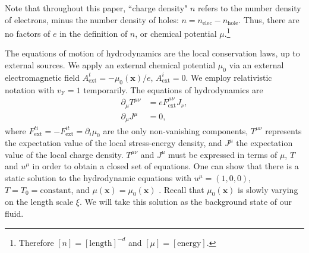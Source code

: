 \documentclass[10pt, oneside]{book}
\begin{document}
\begin{doublespace}
Note that throughout this paper, ``charge density" $n$ refers to the number density of electrons, minus the number density of holes:  $n=n_{\mathrm{elec}} - n_{\mathrm{hole}}$.   Thus, there are no factors of $e$ in the definition of $n$, or chemical potential $\mu$.\footnote{Therefore $[n] = [\text{length}]^{-d}$ and $[\mu]=[\text{energy}]$.}

The equations of motion of hydrodynamics are the local conservation laws, up to external sources.  We apply an external chemical potential $\mu_0$ via an external electromagnetic field $A_{\mathrm{ext}}^t = -\mu_0(\mathbf{x})/e$, $A^i_{\mathrm{ext}}=0$.   We employ relativistic notation with $v_{\mathrm{F}}=1$ temporarily.  The equations of hydrodynamics are\begin{subequations}\label{hydroeq}\begin{align}
\partial_\mu T^{\mu\nu} &= e F^{\mu\nu}_{\mathrm{ext}} J_\nu, \\
\partial_\mu J^\mu &= 0,
\end{align}\end{subequations}where $F^{ti}_{\mathrm{ext}} = -F^{it}_{\mathrm{ext}} = \partial_i \mu_0$ are the only non-vanishing components, $T^{\mu\nu}$ represents the expectation value of the local stress-energy density,  and $J^\mu$ the expectation value of the local charge density.     $T^{\mu\nu}$ and $J^\mu$ must be expressed in terms of $\mu$, $T$ and $u^\mu$ in order to obtain a closed set of equations.   One can show that there is a static solution to the hydrodynamic equations with $u^\mu = (1,0,0)$, $T=T_0=\text{constant}$, and $\mu(\mathbf{x})=\mu_0(\mathbf{x})$ \cite{Lucas:2015lna}.   Recall that $\mu_0(\mathbf{x})$ is slowly varying on the length scale $\xi$.  We will take this solution as the background state of our fluid.



\end{doublespace}
\end{document}
